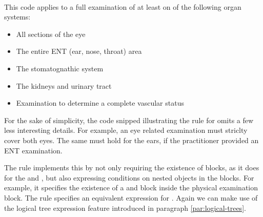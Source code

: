 \paragraph{}
This code applies to a full examination of at least on of the following organ systems:
\begin{itemize}
    \item All sections of the eye
    \item The entire ENT (ear, nose, throat) area
    \item The stomatognathic system
    \item The kidneys and urinary tract
    \item Examination to determine a complete vascular status
\end{itemize}
For the sake of simplicity, the code snipped illustrating the rule for  omits a few less interesting details.
For example, an eye related examination must striclty cover both eyes.
The same must hold for the ears, if the practitioner provided an ENT examination.

The rule implements this by not only requiring the existence of blocks, as it does for the  and ,
but also expressing conditions on nested objects in the blocks.
For example, it specifies the existence of a  and  block inside the  physical examination block.
The rule specifies an equivalent expression for .
Again we can make use of the logical tree expression feature introduced in paragraph \ref{par:logical-trees}.

